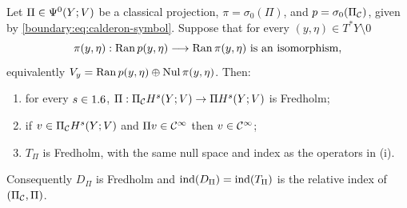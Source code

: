 \begin{theorem}\label{boundary:thm:symbolic}
Let $\Pi\in\Psi^{0}(Y;V)$ be a classical projection, $\pi=\sigma_0(\Pi)$, and
$p=\sigma_0(\Pi_{\mathcal{C}})$, given by \eqref{boundary:eq:calderon-symbol}. Suppose that for every
$(y,\eta)\in T^*Y\setminus0$
\begin{equation}\label{boundary:eq:symbolic}
\pi(y,\eta):\operatorname{Ran} p(y,\eta)\longrightarrow\operatorname{Ran}\pi(y,\eta)\ \text{is an isomorphism},
\end{equation}
equivalently $V_y=\operatorname{Ran} p(y,\eta)\oplus\operatorname{Nul}\pi(y,\eta)$. Then:
\begin{enumerate}[label=(\roman*)]
\item for every $s\in1.6$, $\Pi:\Pi_{\mathcal{C}} H^s(Y;V)\to\Pi H^s(Y;V)$ is Fredholm;
\item if $v\in\Pi_{\mathcal{C}} H^s(Y;V)$ and $\Pi v\in\mathcal{C}^\infty$ then $v\in\mathcal{C}^\infty$;
\item $T_\Pi$ is Fredholm, with the same null space and index as the operators in (i).
\end{enumerate}
Consequently $D_\Pi$ is Fredholm and $\operatorname{ind}(D_\Pi)=\operatorname{ind}(T_\Pi)$ is the relative index of
$(\Pi_{\mathcal{C}},\Pi)$.
\end{theorem}
